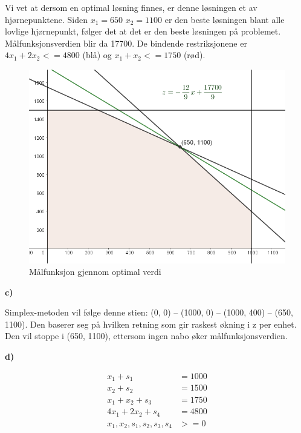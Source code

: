 \documentclass{article}
\begin{document}
    Vi vet at dersom en optimal løsning finnes, er denne løsningen et av hjørnepunktene. Siden $x_1 = 650$ $x_2 = 1100$ er den beste løsningen blant alle lovlige hjørnepunkt,
    følger det at det er den beste løsningen på problemet. Målfunksjonsverdien blir da 17700. De bindende restriksjonene er $4x_1 + 2x_2 <= 4800$ (blå) og $x_1 + x_2 <= 1750$ (rød).
    
    \begin{figure}
        \centering
        \includegraphics*[width=\linewidth]{img/1b.PNG}
        \caption*{Målfunksjon gjennom optimal verdi}
    \end{figure}
    
    \small\textbf{c)}
    
    Simplex-metoden vil følge denne stien: (0, 0) -- (1000, 0) -- (1000, 400) -- (650, 1100). Den baserer seg på hvilken retning som gir raskest økning i z per enhet.
    Den vil stoppe i (650, 1100), ettersom ingen nabo øker målfunksjonsverdien.
    
    \small\textbf{d)}
    
    \begin{align*}
        x_1 + s_1 &= 1000 \\
        x_2 + s_2 &= 1500 \\
        x_1 + x_2 + s_3 &= 1750 \\
        4x_1 + 2x_2 + s_4 &= 4800 \\
        x_1, x_2, s_1, s_2, s_3, s_4 &>= 0
    \end{align*}
\end{document}

